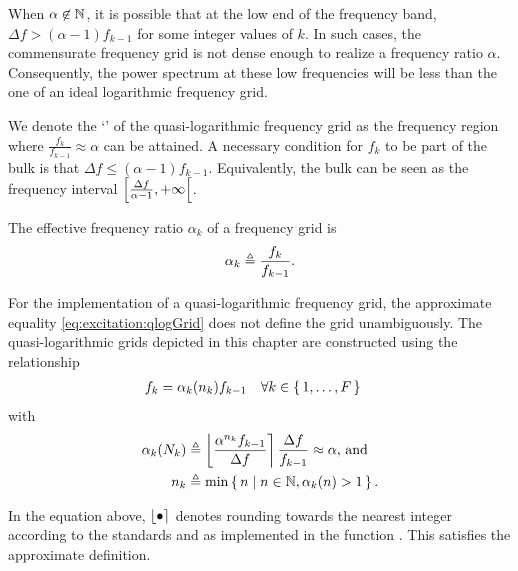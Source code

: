   \begin{remark}
  When $\alpha \not\in \mathbb{N}$, it is possible that at the low end of the frequency band, $\Delta f > \left(\alpha -1 \right) f_{k-1}$ for some integer values of $k$.
  In such cases, the commensurate frequency grid is not dense enough to realize a frequency ratio $\alpha$.
  Consequently, the power spectrum at these low frequencies will be less than the one of an ideal logarithmic frequency grid.
  \end{remark}

  \begin{definition} \label{def:excitation:bulk}
  We denote the `' of the quasi-logarithmic frequency grid as the frequency region where $\frac{f_k}{f_{k-1}} \approx \alpha$ can be attained.
  A necessary condition for $f_k$ to be part of the bulk is that $\Delta f \leq \left(\alpha -1 \right) f_{k-1}$.
  Equivalently, the bulk can be seen as the frequency interval $\left[ \frac{\Delta f}{\alpha - 1} , +\infty \right[$.
  \end{definition}

  \begin{definition}
  The effective frequency ratio $\alpha_k$ of a frequency grid is
  \begin{equation}
    \alpha_k \triangleq  \frac{f_k}{f_{k-1}}
    \text{.}
  \end{equation}
  \end{definition}

  \begin{definition}
  For the implementation of a quasi-logarithmic frequency grid,  the approximate equality \eqref{eq:excitation:qlogGrid} does not define the grid unambiguously.
  The quasi-logarithmic grids depicted in this chapter are constructed using the relationship
  \begin{align}
       \label{eq:excitation:qlog:gridDef}
    f_k & = \alpha_k(n_k) f_{k-1}  
        \quad
            \forall k \in \set{1,\ldots,F}
\end{align}
with
\begin{align}
     \label{eq:excitation:qlog:roundAlpha}
      \alpha_k(N_k) & \triangleq 
          \left\lfloor    \frac{\alpha^{n_k} f_{k-1}}{\Delta f} \right\rceil    
           \frac{\Delta f}{f_{k-1}}
      \approx \alpha \text{, and}\\
         \label{eq:excitation:qlog:alphaPowerDef}
          n_k & \triangleq 
            \min 
            \set{n | n \in \ensuremath{\mathbb{N}}, \alpha_k(n) > 1}
     \text{.}
  \end{align}
  \end{definition}
  In the equation above, $\left\lfloor \bullet \right\rceil$ denotes rounding towards the nearest integer according to the \IEEEfloat standards and as implemented in the \MATLAB function .
  This satisfies the approximate definition.
  

